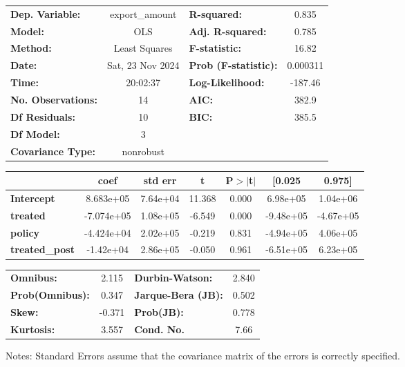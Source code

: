 \begin{center}
\begin{tabular}{lclc}
\toprule
\textbf{Dep. Variable:}    &  export\_amount  & \textbf{  R-squared:         } &     0.835   \\
\textbf{Model:}            &       OLS        & \textbf{  Adj. R-squared:    } &     0.785   \\
\textbf{Method:}           &  Least Squares   & \textbf{  F-statistic:       } &     16.82   \\
\textbf{Date:}             & Sat, 23 Nov 2024 & \textbf{  Prob (F-statistic):} &  0.000311   \\
\textbf{Time:}             &     20:02:37     & \textbf{  Log-Likelihood:    } &   -187.46   \\
\textbf{No. Observations:} &          14      & \textbf{  AIC:               } &     382.9   \\
\textbf{Df Residuals:}     &          10      & \textbf{  BIC:               } &     385.5   \\
\textbf{Df Model:}         &           3      & \textbf{                     } &             \\
\textbf{Covariance Type:}  &    nonrobust     & \textbf{                     } &             \\
\bottomrule
\end{tabular}
\begin{tabular}{lcccccc}
                       & \textbf{coef} & \textbf{std err} & \textbf{t} & \textbf{P$> |$t$|$} & \textbf{[0.025} & \textbf{0.975]}  \\
\midrule
\textbf{Intercept}     &    8.683e+05  &     7.64e+04     &    11.368  &         0.000        &     6.98e+05    &     1.04e+06     \\
\textbf{treated}       &   -7.074e+05  &     1.08e+05     &    -6.549  &         0.000        &    -9.48e+05    &    -4.67e+05     \\
\textbf{policy}        &   -4.424e+04  &     2.02e+05     &    -0.219  &         0.831        &    -4.94e+05    &     4.06e+05     \\
\textbf{treated\_post} &    -1.42e+04  &     2.86e+05     &    -0.050  &         0.961        &    -6.51e+05    &     6.23e+05     \\
\bottomrule
\end{tabular}
\begin{tabular}{lclc}
\textbf{Omnibus:}       &  2.115 & \textbf{  Durbin-Watson:     } &    2.840  \\
\textbf{Prob(Omnibus):} &  0.347 & \textbf{  Jarque-Bera (JB):  } &    0.502  \\
\textbf{Skew:}          & -0.371 & \textbf{  Prob(JB):          } &    0.778  \\
\textbf{Kurtosis:}      &  3.557 & \textbf{  Cond. No.          } &     7.66  \\
\bottomrule
\end{tabular}
\end{center}

Notes: \newline
 [1] Standard Errors assume that the covariance matrix of the errors is correctly specified.